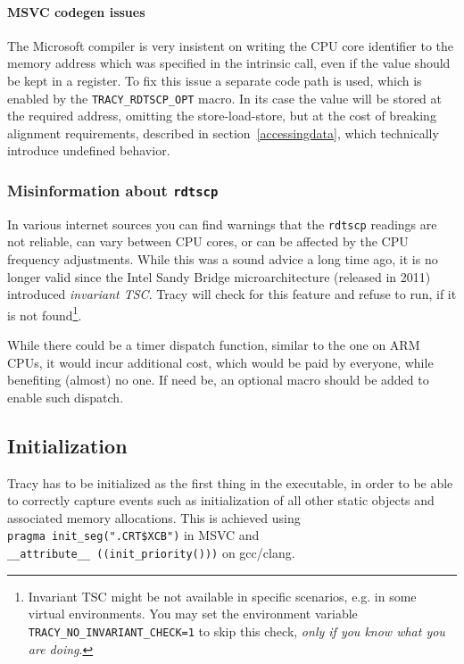 \documentclass[hidelinks,titlepage,a4paper]{article}
\begin{document}
\paragraph{MSVC codegen issues}

The Microsoft compiler is very insistent on writing the CPU core identifier to the memory address which was specified in the intrinsic call, even if the value should be kept in a register. To fix this issue a separate code path is used, which is enabled by the \texttt{TRACY\_RDTSCP\_OPT} macro. In its case the value will be stored at the required address, omitting the store-load-store, but at the cost of breaking alignment requirements, described in section~\ref{accessingdata}, which technically introduce undefined behavior.

\subsubsection{Misinformation about \texttt{rdtscp}}

In various internet sources you can find warnings that the \texttt{rdtscp} readings are not reliable, can vary between CPU cores, or can be affected by the CPU frequency adjustments. While this was a sound advice a long time ago, it is no longer valid since the Intel Sandy Bridge microarchitecture (released in 2011) introduced \emph{invariant TSC}. Tracy will check for this feature and refuse to run, if it is not found\footnote{Invariant TSC might be not available in specific scenarios, e.g. in some virtual environments. You may set the environment variable \texttt{TRACY\_NO\_INVARIANT\_CHECK=1} to skip this check, \emph{only if you know what you are doing}.}.

While there could be a timer dispatch function, similar to the one on ARM CPUs, it would incur additional cost, which would be paid by everyone, while benefiting (almost) no one. If need be, an optional macro should be added to enable such dispatch.

\subsection{Initialization}

Tracy has to be initialized as the first thing in the executable, in order to be able to correctly capture events such as initialization of all other static objects and associated memory allocations. This is achieved using \texttt{pragma~init\_seg(".CRT\$XCB")} in MSVC and \texttt{\_\_attribute\_\_~((init\_priority()))} on gcc/clang.
\end{document}
